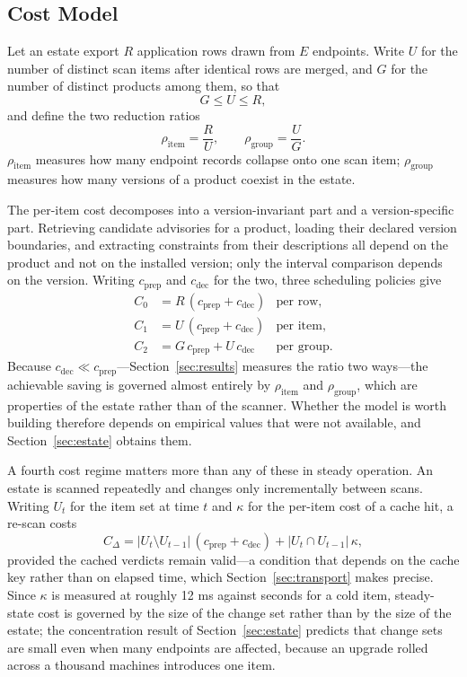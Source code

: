 \documentclass[fleqn,10pt,lineno]{wlpeerj}
\begin{document}
\subsection{Cost Model}
Let an estate export $R$ application rows drawn from $E$ endpoints. Write $U$ for the number of distinct scan items after identical rows are merged, and $G$ for the number of distinct products among them, so that
\begin{equation}
G \leq U \leq R,
\end{equation}
and define the two reduction ratios
\begin{equation}
\rho_{\text{item}} = \frac{R}{U}, \qquad \rho_{\text{group}} = \frac{U}{G}.
\end{equation}
$\rho_{\text{item}}$ measures how many endpoint records collapse onto one scan item; $\rho_{\text{group}}$ measures how many versions of a product coexist in the estate.

The per-item cost decomposes into a version-invariant part and a version-specific part. Retrieving candidate advisories for a product, loading their declared version boundaries, and extracting constraints from their descriptions all depend on the product and not on the installed version; only the interval comparison depends on the version. Writing $c_{\text{prep}}$ and $c_{\text{dec}}$ for the two, three scheduling policies give
\begin{align}
C_0 &= R\,(c_{\text{prep}} + c_{\text{dec}}) & \text{per row}, \\
C_1 &= U\,(c_{\text{prep}} + c_{\text{dec}}) & \text{per item}, \\
C_2 &= G\,c_{\text{prep}} + U\,c_{\text{dec}} & \text{per group}.
\end{align}
Because $c_{\text{dec}} \ll c_{\text{prep}}$---Section~\ref{sec:results} measures the ratio two ways---the achievable saving is governed almost entirely by $\rho_{\text{item}}$ and $\rho_{\text{group}}$, which are properties of the estate rather than of the scanner. Whether the model is worth building therefore depends on empirical values that were not available, and Section~\ref{sec:estate} obtains them.

A fourth cost regime matters more than any of these in steady operation. An estate is scanned repeatedly and changes only incrementally between scans. Writing $U_t$ for the item set at time $t$ and $\kappa$ for the per-item cost of a cache hit, a re-scan costs
\begin{equation}
C_\Delta = |U_t \setminus U_{t-1}|\,(c_{\text{prep}} + c_{\text{dec}}) + |U_t \cap U_{t-1}|\,\kappa,
\end{equation}
provided the cached verdicts remain valid---a condition that depends on the cache key rather than on elapsed time, which Section~\ref{sec:transport} makes precise. Since $\kappa$ is measured at roughly 12 ms against seconds for a cold item, steady-state cost is governed by the size of the change set rather than by the size of the estate; the concentration result of Section~\ref{sec:estate} predicts that change sets are small even when many endpoints are affected, because an upgrade rolled across a thousand machines introduces one item.
\end{document}

